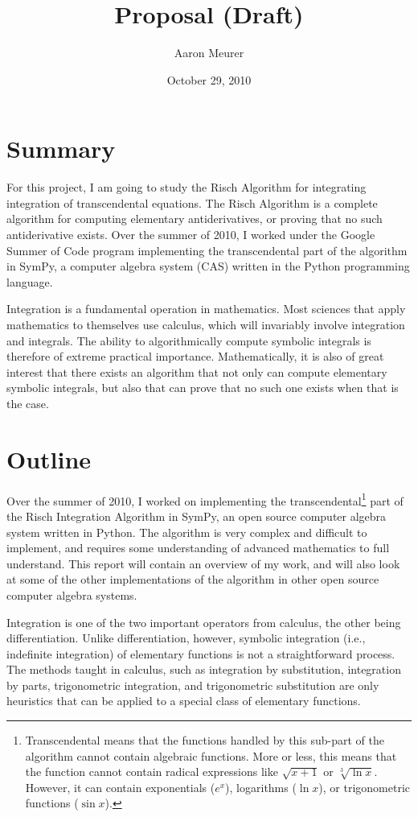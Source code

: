 \documentclass[12pt]{article}
\begin{document}
\title{Proposal (Draft)}
\author{Aaron Meurer}
\date{October 29, 2010}
\maketitle
\section{Summary}
For this project, I am going to study the Risch Algorithm for
integrating integration of transcendental equations.  The Risch
Algorithm is a complete algorithm for computing elementary
antiderivatives, or proving that no such antiderivative exists.  Over
the summer of 2010, I worked under the Goo\-gle Summer of Code program
implementing the transcendental part of the algorithm in Sym\-Py, a
computer algebra system (CAS) written in the Py\-thon programming
language.

Integration is a fundamental operation in mathematics.  Most sciences
that apply mathematics to themselves use calculus, which will invariably
involve integration and integrals.  The ability to algorithmically
compute symbolic integrals is therefore of extreme practical importance.
 Mathematically, it is also of great interest that there exists an
algorithm that not only can compute elementary symbolic integrals, but
also that can prove that no such one exists when that is the case.

\section{Outline}
Over the summer of 2010, I worked on implementing the transcendental\footnote{Transcendental means that the functions handled by this sub-part of the algorithm cannot contain algebraic functions.  More or less, this means that the function cannot contain radical expressions like $\sqrt{x + 1}$ or $\sqrt[3]{\ln{x}}$.  However, it can contain exponentials ($e^x$), logarithms ($\ln{x}$), or trigonometric functions ($\sin{x}$).}
part of the Risch Integration Algorithm in Sym\-Py, an open source
computer algebra system written in Python.  The algorithm is very
complex and difficult to implement, and requires some understanding of
advanced mathematics to full understand.  This report will contain an
overview of my work, and will also look at some of the other
implementations of the algorithm in other open source computer algebra
systems.  

Integration is one of the two important operators from calculus, the
other being differentiation.  Unlike differentiation, however, symbolic
integration (i.e., indefinite integration) of elementary functions is
not a straightforward process. The methods taught in calculus, such as
integration by substitution, integration by parts, trigonometric
integration, and trigonometric substitution are only heuristics that can
be applied to a special class of elementary functions.  
\end{document}
